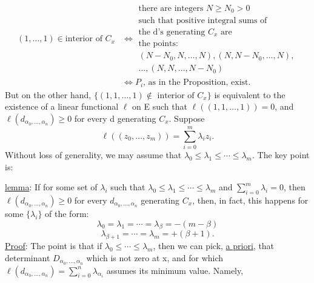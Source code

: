 \[
\begin{aligned}
(1,\ldots,1)\in\text{interior of }C_x
&\Longleftrightarrow
\begin{gathered}
\text{there are integers }N\ge N_0>0\\
\text{such that positive integral sums of}\\
\text{the d's generating }C_x\text{ are}\\
\text{the points:}\\
(N-N_0,N,\ldots,N),(N,N-N_0,\ldots,N),\\
\ldots,(N,N,\ldots,N-N_0)
\end{gathered}\\
&\Longleftrightarrow
P_i\text{, as in the Proposition, exist.}
\end{aligned}
\]
But on the other hand, $\{(1,1,\ldots,1)\notin\text{ interior of }C_x\}$ is
equivalent to the existence of a linear functional $\ell$ on E such that
$\ell((1,1,\ldots,1))=0$, and $\ell(d_{\alpha_0,\ldots,\alpha_n})\ge0$ for every d
generating $C_x$. Suppose
\[
\ell((z_0,\ldots,z_m))=\sum_{i=0}^m\lambda_i z_i.
\]
Without loss of generality, we may assume that $\lambda_0\le\lambda_1\le\cdots\le\lambda_m$.
The key point is:

\uline{lemma}: If for some set of $\lambda_i$ such that $\lambda_0\le\lambda_1\le\cdots\le\lambda_m$
and $\displaystyle\sum_{i=0}^m\lambda_i=0$, then
$\ell(d_{\alpha_0,\ldots,\alpha_n})\ge0$ for every $d_{\alpha_0,\ldots,\alpha_n}$
generating $C_x$, then, in fact, this happens for some $\{\lambda_i\}$ of the form:
\[
\lambda_0=\lambda_1=\cdots=\lambda_\beta=-(m-\beta)
\]
\[
\lambda_{\beta+1}=\cdots=\lambda_m=+(\beta+1).
\]
\uline{Proof}: The point is that if $\lambda_0\le\cdots\le\lambda_m$, then we can pick,
\uline{a priori}, that determinant $D_{\alpha_0,\ldots,\alpha_n}$ which is not zero at x, and
for which $\ell(d_{\alpha_0,\ldots,\alpha_n})=\displaystyle\sum_{i=0}^n\lambda_{\alpha_i}$
assumes its minimum value. Namely,
